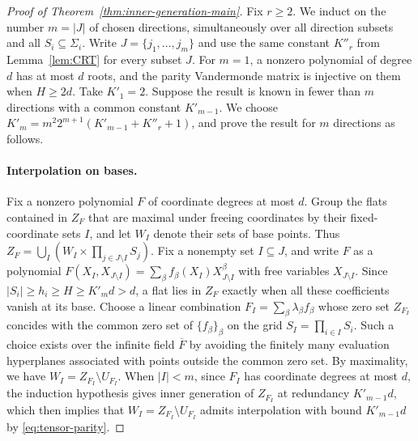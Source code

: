 \documentclass[11pt,letterpaper]{article}
\renewcommand{\ge}{\geqslant}
\theoremstyle{definition}
\theoremstyle{remark}
\begin{document}
\begin{proof}[Proof of Theorem~\ref{thm:inner-generation-main}]
Fix $r \ge 2$. We induct on the number $m = |J|$ of chosen directions, simultaneously
over all direction subsets and all $S_i\subseteq\Sigma_i$.
Write $J=\{j_1,\ldots,j_m\}$ and use the same constant $K''_r$
from Lemma~\ref{lem:CRT} for every subset $J$.
For $m=1$, a nonzero polynomial of degree $d$ has at most $d$
roots, and the parity Vandermonde matrix is injective on them
when $H\ge2d$. Take $K'_1=2$.
Suppose the result is known in fewer than $m$ directions with
a common constant $K'_{m-1}$. We choose $K'_m = m^2 2^{m+1}(K'_{m-1}+K''_r+1)$, and prove the result for $m$ directions as follows.

\paragraph{Interpolation on bases.}
Fix a nonzero polynomial \(F\) of coordinate degrees at most \(d\).
Group the flats contained in \(Z_F\) that are maximal under
freeing coordinates by their fixed-coordinate sets \(I\), and let
\(W_I\) denote their sets of base points. Thus
$Z_F=\bigcup_I(W_I\times\prod_{j \in J \setminus I}S_j)$.
Fix a nonempty set \(I\subseteq J\), and write $F$ as a polynomial \(F(X_I,X_{J \setminus I})=\sum_\beta f_\beta(X_I)X_{J \setminus I}^{\beta}\) with free variables $X_{J \setminus I}$. 
Since $|S_i|\ge h_i\ge H\ge K'_m d>d$, a flat lies in $Z_F$
exactly when all these coefficients vanish at its base.
Choose a linear combination \(F_I=\sum_\beta\lambda_\beta f_\beta\) whose zero set $Z_{F_I}$ concides with the common zero set of $\{f_\beta\}_\beta$ on the grid \(S_I = \prod_{i \in I} S_i\). Such a choice exists over the infinite field $\overline{F}$ by avoiding the finitely many evaluation hyperplanes associated with points outside the common zero set.
By maximality, we have  $W_I=Z_{F_I}\setminus U_{F_I}$.
When $|I|<m$, since $F_I$ has coordinate degrees at most $d$, the induction hypothesis gives inner generation of $Z_{F_I}$ at redundancy $K'_{m-1}d$, which then implies that $W_I=Z_{F_I}\setminus U_{F_I}$ admits interpolation with bound $K'_{m-1}d$ by \eqref{eq:tensor-parity}.


\end{proof}
\end{document}
